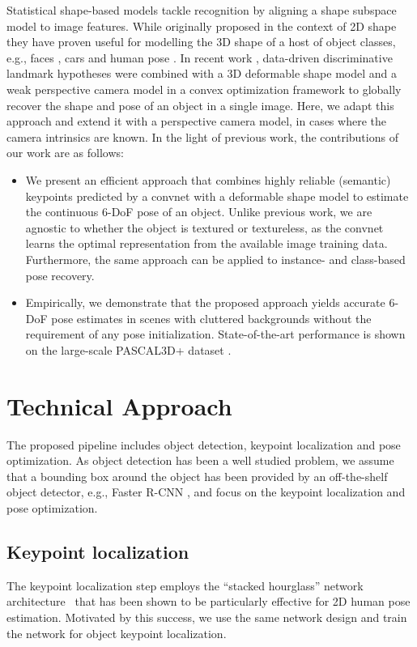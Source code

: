 \documentclass[letterpaper, 10 pt, conference]{ieeeconf}
\begin{document}
Statistical shape-based models tackle recognition by aligning a shape subspace model to image features.  While originally proposed in the context of 2D shape  \cite{cootes1995} they have proven useful for modelling the 3D shape of a host of object classes, e.g., faces \cite{cao20133d}, cars \cite{zia2013detailed,murthy2016reconstructing} and human pose \cite{ramakrishna2012}.  In recent work \cite{zhu_popup}, data-driven discriminative landmark hypotheses were combined with a 3D deformable shape model and a weak perspective camera model in a convex optimization framework to globally recover the shape and pose of an object in a single image.  Here, we adapt this approach and extend it with a perspective camera model, in cases where the camera intrinsics are known. 
\vspace{5pt}In the light of previous work, the contributions of our work are as follows:
\begin{itemize}
\item We present an efficient approach that combines highly reliable (semantic) keypoints predicted by a convnet with a deformable shape model to estimate the continuous 6-DoF pose of an object. Unlike previous work, we are agnostic to whether the object is textured or textureless, as the convnet learns the optimal representation from the available image training data.  Furthermore, the same approach can be applied to instance- and class-based pose recovery.  

\item Empirically, we demonstrate that the proposed approach yields accurate 6-DoF pose estimates in scenes with cluttered backgrounds without the requirement of any pose initialization. State-of-the-art performance is shown on the large-scale PASCAL3D+ dataset \cite{xiang2014}.  
\end{itemize} 
\section{Technical Approach}
The proposed pipeline includes object detection, keypoint localization and pose optimization. As object detection has been a well studied problem, we assume that a bounding box around the object has been provided by an off-the-shelf object detector, e.g., Faster R-CNN \cite{ren2015faster}, and focus on the keypoint localization and pose optimization.

\subsection{Keypoint localization}
The keypoint localization step employs the ``stacked hourglass'' network architecture~\cite{newell2016stacked} that has been shown to be particularly effective for 2D human pose estimation. Motivated by this success, we use the same network design and train the network for object keypoint localization. 
\end{document}
